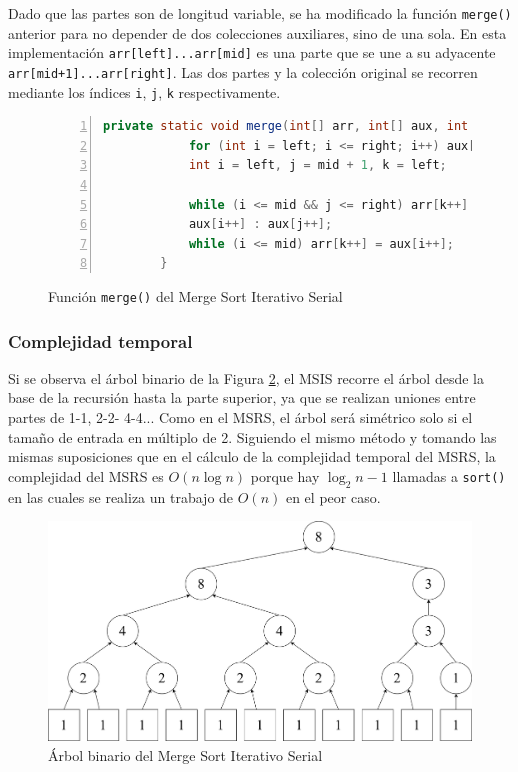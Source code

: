 \documentclass[titlepage]{article}
\begin{document}
Dado que las partes son de longitud variable, se ha modificado la función \lstinline{merge()} anterior para no depender de dos colecciones auxiliares, sino de una sola. En esta implementación \lstinline{arr[left]...arr[mid]} es una parte que se une a su adyacente \lstinline{arr[mid+1]...arr[right]}. Las dos partes y la colección original se recorren mediante los índices \lstinline{i}, \lstinline{j}, \lstinline{k} respectivamente.

\begin{figure}[hbtp]
    \begin{lstlisting}[language=java, frame=single, numbers=left]
        private static void merge(int[] arr, int[] aux, int left, int mid, int right) {
            for (int i = left; i <= right; i++) aux[i] = arr[i];
            int i = left, j = mid + 1, k = left; 
            
            while (i <= mid && j <= right) arr[k++] = (aux[i] <= aux[j])? 
            aux[i++] : aux[j++];
            while (i <= mid) arr[k++] = aux[i++];
        }    
    \end{lstlisting}
    \caption{Función \lstinline{merge()} del Merge Sort Iterativo Serial}
    \label{fig:MSIS_merge()}
\end{figure}

\subsubsection{Complejidad temporal}
Si se observa el árbol binario de la Figura \ref{fig:arbolMSIS}, el MSIS recorre el árbol desde la base de la recursión hasta la parte superior, ya que se realizan uniones entre partes de 1-1, 2-2- 4-4... Como en el MSRS, el árbol será simétrico solo si el tamaño de entrada en múltiplo de 2. Siguiendo el mismo método y tomando las mismas suposiciones que en el cálculo de la complejidad temporal del MSRS, la complejidad del MSRS es \(O(n \log{n})\) porque hay \(\log_2{n}-1\) llamadas a \lstinline{sort()} en las cuales se realiza un trabajo de \(O(n)\) en el peor caso.

\begin{figure}
    \centering
    \includegraphics[width=0.8\linewidth]{Diagrames/arbolMSISirregular.png}
    \caption{Árbol binario del Merge Sort Iterativo Serial}
    \label{fig:arbolMSIS}
\end{figure}
\end{document}
